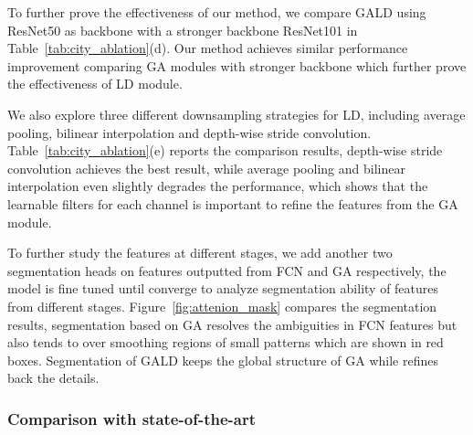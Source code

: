 \documentclass{bmvc2k}
\begin{document}
 To further prove the effectiveness of our method, we compare GALD using ResNet50 as backbone with a stronger backbone ResNet101 in Table~\ref{tab:city_ablation}(d). Our method achieves similar performance improvement comparing GA modules with stronger backbone which further prove the effectiveness of LD module.

 We also explore three different downsampling strategies for LD, including average pooling, bilinear interpolation and depth-wise stride convolution. Table~\ref{tab:city_ablation}(e) reports the comparison results, depth-wise stride convolution achieves the best result, while average pooling and bilinear interpolation even slightly degrades the performance, which shows that the learnable filters for each channel is important to refine the features from the GA module.

To further study the features at different stages, we add another two segmentation heads on features outputted from FCN and GA respectively, the model is fine tuned until converge to analyze segmentation ability of features from different stages. Figure~\ref{fig:attenion_mask} compares the segmentation results, segmentation based on GA resolves the ambiguities in FCN features but also tends to over smoothing regions of small patterns which are shown in red boxes. Segmentation of GALD keeps the global structure of GA while refines back the details. 


\subsubsection{Comparison with state-of-the-art}
\end{document}
